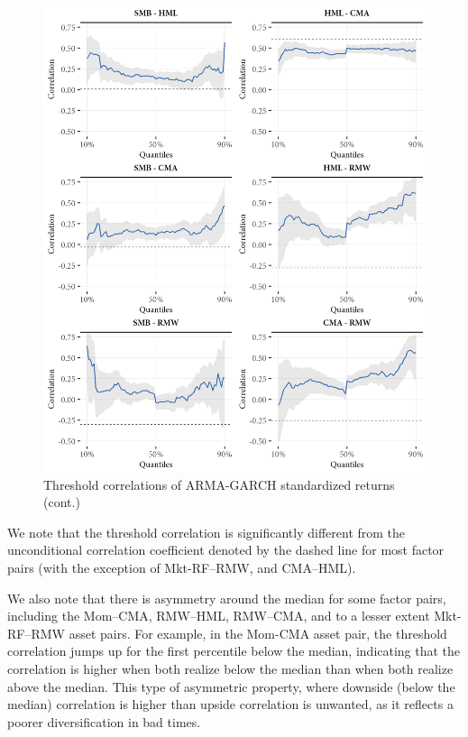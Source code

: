 \begin{figure}[!ht]
  \ContinuedFloat
  \centering

  \includegraphics[scale=1]{graphics/threshold2.png}

  \caption{Threshold correlations of ARMA-GARCH standardized returns (cont.)}
\end{figure}

We note that the threshold correlation is significantly different from the unconditional correlation coefficient denoted by the dashed line for most factor pairs (with the exception of Mkt-RF--RMW, and CMA--HML).

We also note that there is asymmetry around the median for some factor pairs, including the Mom--CMA, RMW--HML, RMW--CMA, and to a lesser extent Mkt-RF--RMW asset pairs. For example, in the Mom-CMA asset pair, the threshold correlation jumps up for the first percentile below the median, indicating that the correlation is higher when both realize below the median than when both realize above the median. This type of asymmetric property, where downside (below the median) correlation is higher than upside correlation is unwanted, as it reflects a poorer diversification in bad times. 

